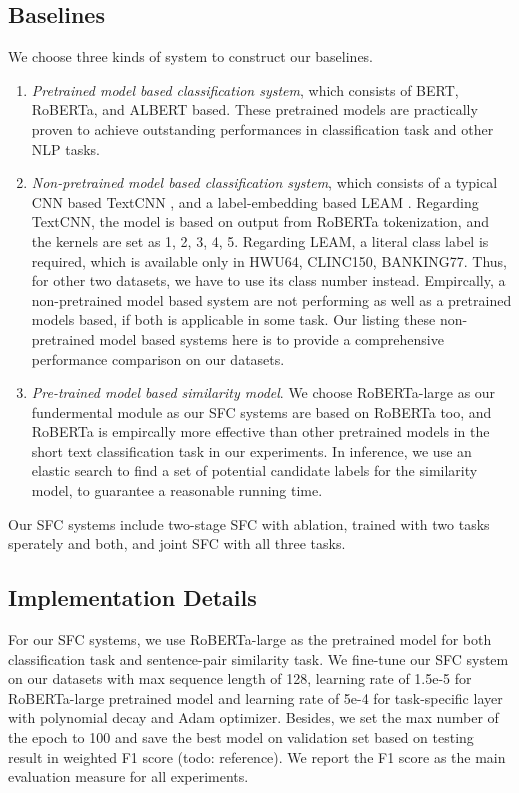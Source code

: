 \documentclass[letterpaper]{article} %
\begin{document}
  \subsection{Baselines}
  We choose three kinds of system to construct our baselines.

  \begin{enumerate}
    \item \emph{Pretrained model based classification system}, which consists of
    BERT,  RoBERTa,  and  ALBERT  \cite{lan2019albert}  based.  These pretrained
    models  are  practically  proven  to  achieve  outstanding  performances  in
    classification task and other NLP tasks.

    \item   \emph{Non-pretrained   model  based  classification  system},  which
    consists  of  a typical CNN based TextCNN \cite{kim2014convolutional}, and a
    label-embedding based LEAM \cite{wang2018joint}. Regarding TextCNN, the
    model is based on output from RoBERTa tokenization, and the kernels are set
    as 1, 2, 3, 4, 5. Regarding LEAM, a literal class label is required, which
    is available only in HWU64, CLINC150, BANKING77. Thus, for other two
    datasets, we have to use its class number instead.  Empircally,
    a  non-pretrained  model  based  system  are  not  performing  as  well as a
    pretrained  models  based,  if  both is applicable in some task. Our listing
    these  non-pretrained model based systems here is to provide a comprehensive
    performance comparison on our datasets.

    \item   \emph{Pre-trained   model   based   similarity   model}.  We  choose
    RoBERTa-large  as  our  fundermental  module as our SFC systems are based on
    RoBERTa  too, and RoBERTa is empircally more effective than other pretrained
    models  in  the  short  text  classification  task  in  our  experiments. In
    inference,  we  use  an  elastic search to find a set of potential candidate
    labels for the similarity model, to guarantee a reasonable running time.
  \end{enumerate}

  Our SFC systems include two-stage SFC with ablation, trained with two tasks
  sperately and both, and joint SFC with all three tasks.

  \subsection{Implementation Details}
  For  our  SFC  systems,  we  use RoBERTa-large as the pretrained model for both
  classification  task  and  sentence-pair similarity task. We fine-tune
  our  SFC  system  on  our datasets with max sequence length of 128,
  learning  rate  of 1.5e-5 for RoBERTa-large pretrained model and learning rate
  of  5e-4  for  task-specific  layer  with polynomial decay and Adam optimizer.
  Besides,  we  set  the  max number of the epoch to 100 and save the best model on
  validation  set based on testing result in weighted F1 score (todo: reference). 
  We report the F1 score as the main evaluation measure for all experiments.
\end{document}
